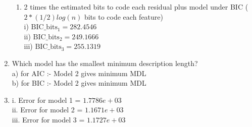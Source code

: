 \documentclass[english]{article}
\begin{document}
\begin{enumerate}
\begin{enumerate}
\item 2 times the estimated bits to code each residual plus model under BIC  ($2*(1/2) log(n)$ bits to code each feature) \\
i)   $\text{BIC}\_\text{bits}_1 = 282.4546$ \\
ii)  $\text{BIC}\_\text{bits}_2 = 249.1666$ \\
iii) $\text{BIC}\_\text{bits}_3 = 255.1319$ \\

\end{enumerate}

\item Which model has the smallest minimum description length? \\
a) for AIC :- Model 2 gives minimum MDL\\
b) for BIC :- Model 2 gives minimum MDL\\

\item  
i. Error for model 1 = $1.7786e+03$ \\
ii. Error for model 2 = $1.1671e+03$ \\
iii. Error for model 3 = $1.1727e+03$ \\

\end{enumerate}
\end{document}
